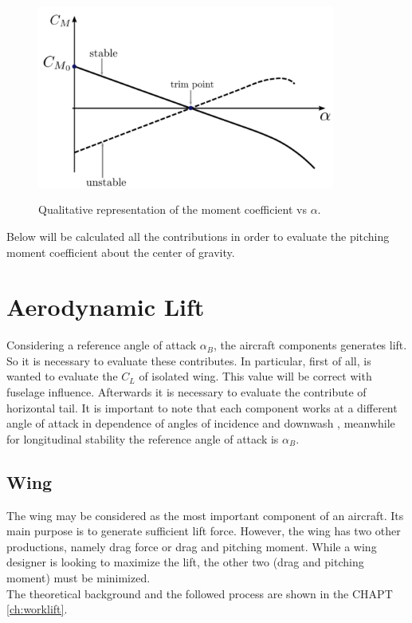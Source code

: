 \begin{figure}[H]
\centering
{\includegraphics[height=6cm]{immagini/cm}} 
\label{stabinstab}
\caption{Qualitative representation of the moment coefficient vs $\alpha$.}
\end{figure} 	


Below will be calculated all the contributions in order to evaluate the pitching moment coefficient about the center of gravity. 


\section{Aerodynamic Lift}		
 Considering a reference angle of attack $\alpha_B$, the aircraft components generates lift. So it is necessary to evaluate these contributes. In particular, first of all, is wanted to evaluate the $C_L$ of isolated wing. This value will be correct with fuselage influence. Afterwards it is necessary to evaluate the contribute of horizontal tail.  It is important to note that each component works at a different angle of attack in dependence of angles of incidence and downwash , meanwhile for longitudinal stability the reference angle of attack is $\alpha_B$.

\subsection{Wing}
 The wing may be considered as the most important component of an aircraft. Its main purpose is  to generate sufficient lift force. However, the wing has two other productions, namely drag force or drag and pitching moment. While a wing designer is looking to maximize the lift, the other two (drag and pitching moment) must be minimized. \\
 The theoretical background and the followed process are shown in the CHAPT \ref{ch:worklift}.

